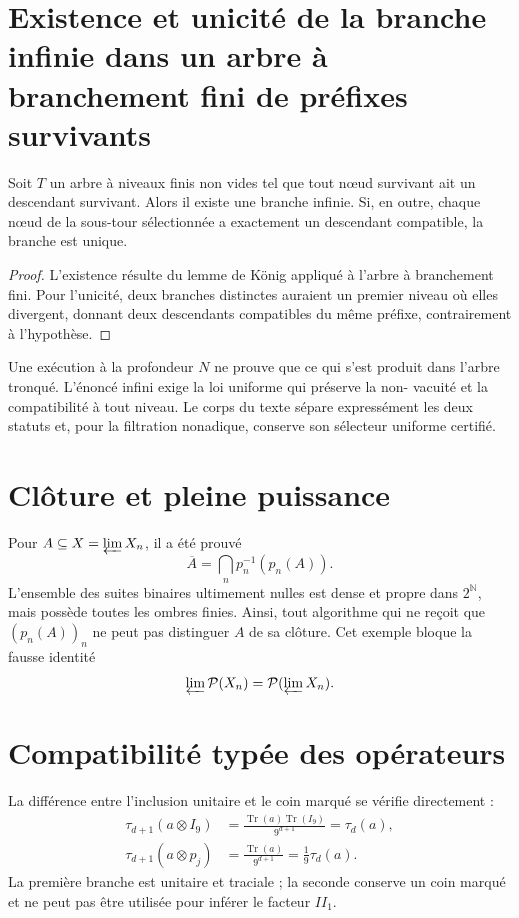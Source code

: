 \section{Existence et unicité de la branche infinie dans un arbre à branchement fini de préfixes survivants}

\begin{lemma}
Soit \(T\) un arbre à niveaux finis non vides tel que tout nœud
survivant ait un descendant survivant. Alors il existe une branche
infinie. Si, en outre, chaque nœud de la sous-tour sélectionnée a exactement
un descendant compatible, la branche est unique.
\end{lemma}

\begin{proof}
L'existence résulte du lemme de König appliqué à l'arbre à branchement fini.
Pour l'unicité, deux branches distinctes auraient un premier niveau où elles
divergent, donnant deux descendants compatibles du même préfixe, contrairement à
l'hypothèse.
\end{proof}

\begin{controlbox}
Une exécution à la profondeur \(N\) ne prouve que ce qui s'est produit dans l'arbre
tronqué. L'énoncé infini exige la loi uniforme qui préserve la non-
vacuité et la compatibilité à tout niveau. Le corps du texte sépare expressément
les deux statuts et, pour la filtration nonadique, conserve son sélecteur uniforme
certifié.
\end{controlbox}

\section{Clôture et pleine puissance}

Pour \(A\subseteq X=\varprojlim X_n\), il a été prouvé
\[
 \overline A=\bigcap_n p_n^{-1}(p_n(A)).
\]
L'ensemble des suites binaires ultimement nulles est dense et propre dans
\(2^{\mathbb N}\), mais possède toutes les ombres finies. Ainsi, tout
algorithme qui ne reçoit que \((p_n(A))_n\) ne peut pas distinguer \(A\) de sa
clôture. Cet exemple bloque la fausse identité
\[
 \varprojlim\mathcal P(X_n)=\mathcal P(\varprojlim X_n).
\]

\section{Compatibilité typée des opérateurs}

La différence entre l'inclusion unitaire et le coin marqué se vérifie
directement :
\[
\begin{aligned}
 \tau_{d+1}(a\otimes I_9)
 &=\frac{\operatorname{Tr}(a)\operatorname{Tr}(I_9)}{9^{d+1}}
 =\tau_d(a),\\
 \tau_{d+1}(a\otimes p_j)
 &=\frac{\operatorname{Tr}(a)}{9^{d+1}}
 =\frac1{9}\tau_d(a).
\end{aligned}
\]
La première branche est unitaire et traciale ; la seconde conserve un coin marqué
et ne peut pas être utilisée pour inférer le facteur \(II_1\).

